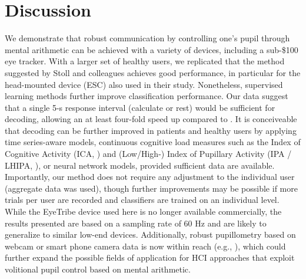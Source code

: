 \documentclass[manuscript]{acmart}
\begin{document}
\section{Discussion}
We demonstrate that robust communication by controlling one's pupil through mental arithmetic can be achieved with a variety of devices, including a sub-\$100 eye tracker. With a larger set of healthy users, we replicated that the method suggested by Stoll and colleagues \cite{Stoll2013} achieves good performance, in particular for the head-mounted device (ESC) also used in their study. Nonetheless, supervised learning methods further improve classification performance. Our data suggest that a single 5-s response interval (calculate or rest) would be sufficient for decoding, allowing an at least four-fold speed up compared to \cite{Stoll2013}. It is conceiveable that decoding can be further improved in patients and healthy users by applying time series-aware models, continuous cognitive load measures such as the Index of Cognitive Activity (ICA, \cite{Marshall2002ICA}) and (Low/High-) Index of Pupillary Activity (IPA / LHIPA, \cite{Duchowski2018,Duchowski2020}), or neural network models, provided sufficient data are available. Importantly, our method does not require any adjustment to the individual user (aggregate data was used), though further improvements may be possible if more trials per user are recorded and classifiers are trained on an individual level. While the EyeTribe device used here is no longer available commercially, the results presented are based on a sampling rate of 60 Hz and are likely to generalize to similar low-end devices. Additionally, robust pupillometry based on webcam or smart phone camera data is now within reach (e.g., \cite{wangwiwattana2018pupilnet, mazziotti2021meye}), which could further expand the possible fields of application for HCI approaches that exploit volitional pupil control based on mental arithmetic.



\end{document}
